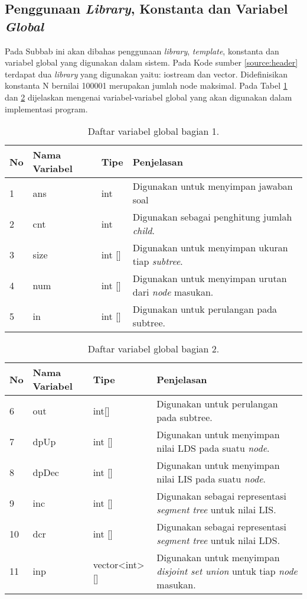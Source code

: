 	\subsection{\quad Penggunaan \textit{Library}, Konstanta dan Variabel \textit{Global}}
	\quad Pada Subbab ini akan dibahas penggunaan \textit{library}, \textit{template}, konstanta dan variabel global yang digunakan dalam sistem. Pada Kode sumber \ref{source:header} terdapat dua \textit{library} yang digunakan yaitu: iostream dan vector. Didefinisikan konstanta N bernilai 100001 merupakan jumlah node maksimal. Pada Tabel \ref{tabel:var_global} dan \ref{tabel:var_global2} dijelaskan mengenai variabel-variabel global yang akan digunakan dalam implementasi program.	
	
	\begin{table}[H]
		\vspace{-0.25cm}
		\centering
		\begin{tabular}{|p{0.5cm}|p{3cm}|p{2.5cm}|p{3cm}|}
		\hline
		No&Nama Variabel&Tipe&Penjelasan \\ \hline
		1&ans&int&Digunakan untuk menyimpan jawaban soal \\ \hline
		2&cnt&int&Digunakan sebagai penghitung jumlah \textit{child}.\\ \hline
		3&size&int []&Digunakan untuk menyimpan ukuran tiap \textit{subtree}.\\ \hline
		4&num&int []&Digunakan untuk menyimpan urutan dari \textit{node} masukan.\\ \hline
		5&in&int []&Digunakan untuk perulangan pada subtree.\\ \hline
		\end{tabular}\caption{Daftar variabel global bagian 1. \label{tabel:var_global}}	
	\end{table}
	\begin{table}[H]
		\centering
		\begin{tabular}{|p{0.5cm}|p{3cm}|p{2.5cm}|p{3cm}|}
			\hline
			No&Nama Variabel&Tipe&Penjelasan \\ \hline
			6&out&int[]&Digunakan untuk perulangan pada subtree.\\ \hline			
			7&dpUp&int []&Digunakan untuk menyimpan nilai LDS pada suatu \textit{node}.\\ \hline
			8&dpDec&int []&Digunakan untuk menyimpan nilai LIS pada suatu \textit{node}.\\ \hline
			9&inc&int []&Digunakan sebagai representasi \textit{segment tree} untuk nilai LIS.\\ \hline
			10&dcr&int []&Digunakan sebagai representasi \textit{segment tree} untuk nilai LDS.\\ \hline
			11&inp&vector<int> []&Digunakan untuk menyimpan \textit{disjoint set union} untuk tiap \textit{node} masukan.\\ \hline
		\end{tabular}\caption{Daftar variabel global bagian 2. \label{tabel:var_global2}}	
	\end{table} 
